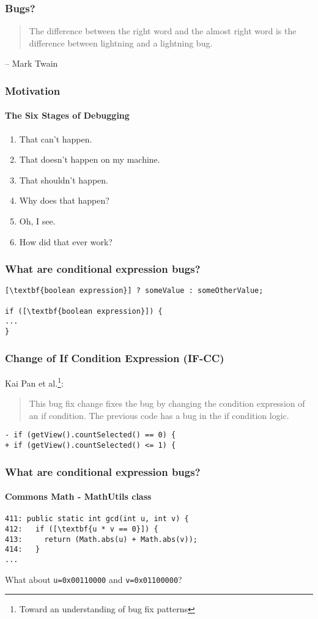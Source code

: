 \begin{frame}  
\frametitle{Bugs?}
\begin{quotation}
The difference between the right word and the almost right word is the difference between lightning and a lightning bug.
\end{quotation}
-- Mark Twain
\end{frame}
 
\begin{frame}
\frametitle{Motivation}
\framesubtitle{The Six Stages of Debugging}
\begin{enumerate}
\item  That can’t happen.
\item  That doesn’t happen on my machine.
\item  That shouldn’t happen.
\item  Why does that happen?
\item  Oh, I see.
\item  How did that ever work?
\end{enumerate}
\end{frame}

 
 
\begin{frame}[fragile]
\frametitle{What are conditional expression bugs?}
\begin{lstlisting}[escapeinside=\[\]]
[\textbf{boolean expression}] ? someValue : someOtherValue;

if ([\textbf{boolean expression}]) {
...
}
\end{lstlisting}
\end{frame}

\begin{frame}[fragile]
\frametitle{Change of If Condition Expression (IF-CC)}
Kai Pan et al.\footnote{Toward an understanding of bug fix patterns}:
\begin{quotation}
This bug fix change fixes the bug by changing the condition expression of an if
condition. The previous code has a bug in the if condition logic.
\end{quotation}

\vspace{1em}

\begin{lstlisting}
- if (getView().countSelected() == 0) {
+ if (getView().countSelected() <= 1) {
\end{lstlisting}
\end{frame}
  
\begin{frame}[fragile]
\frametitle{What are conditional expression bugs?}
\framesubtitle{Commons Math - MathUtils class}
    
\begin{lstlisting}[escapeinside=\[\]]
411: public static int gcd(int u, int v) {
412:   if ([\textbf{u * v == 0}]) {
413:     return (Math.abs(u) + Math.abs(v));
414:   }
...
\end{lstlisting}

\vspace{2em}

\centering What about \texttt{u=0x00110000} and  \texttt{v=0x01100000}?

\end{frame}

